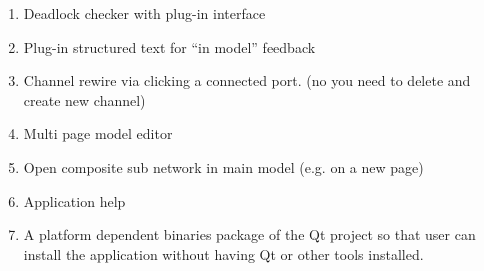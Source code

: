 \begin{itemize}
\begin{enumerate}
\item	Deadlock checker with plug-in interface
\item	Plug-in structured text for “in model” feedback
\item Channel rewire via clicking a connected port. (no you need to delete and
create new channel)
\item	Multi page model editor
\item	Open composite sub network in main model (e.g. on a new page)
\item	Application help
\item A platform dependent binaries package of the Qt project so that user can
install the application without having Qt or other tools installed.
\end{enumerate}
\end{itemize}